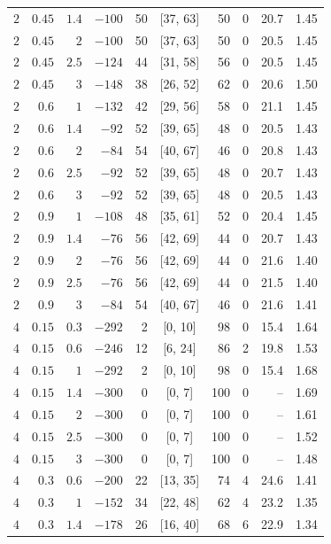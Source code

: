 \begin{table}[t]
\begin{tabular}{rrrrrcrrrr}
$2$ & $0.45$ & $1.4$ & $-100$ & 50 & [37, 63] & 50 & 0 & 20.7 & 1.45 \\
$2$ & $0.45$ & $2$ & $-100$ & 50 & [37, 63] & 50 & 0 & 20.5 & 1.45 \\
$2$ & $0.45$ & $2.5$ & $-124$ & 44 & [31, 58] & 56 & 0 & 20.5 & 1.45 \\
$2$ & $0.45$ & $3$ & $-148$ & 38 & [26, 52] & 62 & 0 & 20.6 & 1.50 \\
$2$ & $0.6$ & $1$ & $-132$ & 42 & [29, 56] & 58 & 0 & 21.1 & 1.45 \\
$2$ & $0.6$ & $1.4$ & $-92$ & 52 & [39, 65] & 48 & 0 & 20.5 & 1.43 \\
$2$ & $0.6$ & $2$ & $-84$ & 54 & [40, 67] & 46 & 0 & 20.8 & 1.43 \\
$2$ & $0.6$ & $2.5$ & $-92$ & 52 & [39, 65] & 48 & 0 & 20.7 & 1.43 \\
$2$ & $0.6$ & $3$ & $-92$ & 52 & [39, 65] & 48 & 0 & 20.5 & 1.43 \\
$2$ & $0.9$ & $1$ & $-108$ & 48 & [35, 61] & 52 & 0 & 20.4 & 1.45 \\
$2$ & $0.9$ & $1.4$ & $-76$ & 56 & [42, 69] & 44 & 0 & 20.7 & 1.43 \\
$2$ & $0.9$ & $2$ & $-76$ & 56 & [42, 69] & 44 & 0 & 21.6 & 1.40 \\
$2$ & $0.9$ & $2.5$ & $-76$ & 56 & [42, 69] & 44 & 0 & 21.5 & 1.40 \\
$2$ & $0.9$ & $3$ & $-84$ & 54 & [40, 67] & 46 & 0 & 21.6 & 1.41 \\
\midrule
$4$ & $0.15$ & $0.3$ & $-292$ & 2 & [0, 10] & 98 & 0 & 15.4 & 1.64 \\
$4$ & $0.15$ & $0.6$ & $-246$ & 12 & [6, 24] & 86 & 2 & 19.8 & 1.53 \\
$4$ & $0.15$ & $1$ & $-292$ & 2 & [0, 10] & 98 & 0 & 15.4 & 1.68 \\
$4$ & $0.15$ & $1.4$ & $-300$ & 0 & [0, 7] & 100 & 0 & -- & 1.69 \\
$4$ & $0.15$ & $2$ & $-300$ & 0 & [0, 7] & 100 & 0 & -- & 1.61 \\
$4$ & $0.15$ & $2.5$ & $-300$ & 0 & [0, 7] & 100 & 0 & -- & 1.52 \\
$4$ & $0.15$ & $3$ & $-300$ & 0 & [0, 7] & 100 & 0 & -- & 1.48 \\
$4$ & $0.3$ & $0.6$ & $-200$ & 22 & [13, 35] & 74 & 4 & 24.6 & 1.41 \\
$4$ & $0.3$ & $1$ & $-152$ & 34 & [22, 48] & 62 & 4 & 23.2 & 1.35 \\
$4$ & $0.3$ & $1.4$ & $-178$ & 26 & [16, 40] & 68 & 6 & 22.9 & 1.34 \\

\end{tabular}
\end{table}
